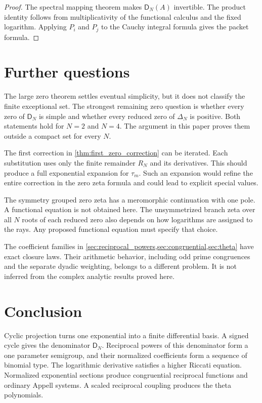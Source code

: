\documentclass{aomart}
\theoremstyle{definition}
\theoremstyle{remark}
\newcommand{\Dfun}{\mathsf D}
\begin{document}
\begin{proof}
The spectral mapping theorem makes $\Dfun_N(A)$ invertible.  The product identity follows from multiplicativity of the functional calculus and the fixed logarithm.  Applying $P_i$ and $P_j$ to the Cauchy integral formula gives the packet formula.
\end{proof}

\section{Further questions}\label{sec:further_questions}

The large zero theorem settles eventual simplicity, but it does not classify the finite exceptional set.  The strongest remaining zero question is whether every zero of $\Dfun_N$ is simple and whether every reduced zero of $\Delta_N$ is positive.  Both statements hold for $N=2$ and $N=4$.  The argument in this paper proves them outside a compact set for every $N$.

The first correction in \cref{thm:first_zero_correction} can be iterated.  Each substitution uses only the finite remainder $R_N$ and its derivatives.  This should produce a full exponential expansion for $\tau_m$.  Such an expansion would refine the entire correction in the zero zeta formula and could lead to explicit special values.

The symmetry grouped zero zeta has a meromorphic continuation with one pole.  A functional equation is not obtained here.  The unsymmetrized branch zeta over all $N$ roots of each reduced zero also depends on how logarithms are assigned to the rays.  Any proposed functional equation must specify that choice.

The coefficient families in \cref{sec:reciprocal_powers,sec:congruential,sec:theta} have exact closure laws.  Their arithmetic behavior, including odd prime congruences and the separate dyadic weighting, belongs to a different problem.  It is not inferred from the complex analytic results proved here.

\section{Conclusion}\label{sec:conclusion}

Cyclic projection turns one exponential into a finite differential basis.  A signed cycle gives the denominator $\Dfun_N$.  Reciprocal powers of this denominator form a one parameter semigroup, and their normalized coefficients form a sequence of binomial type.  The logarithmic derivative satisfies a higher Riccati equation.  Normalized exponential sections produce congruential reciprocal functions and ordinary Appell systems.  A scaled reciprocal coupling produces the theta polynomials.
\end{document}
